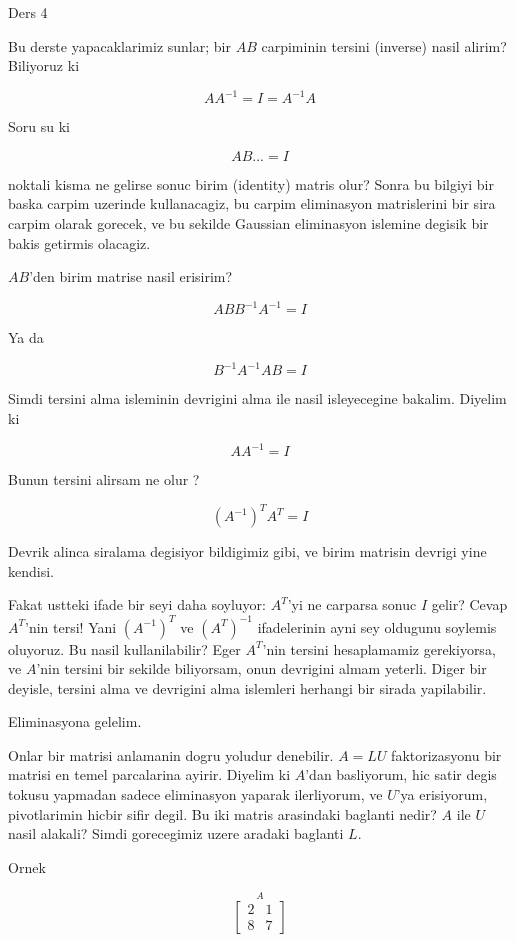 \documentclass[12pt,fleqn]{article}\usepackage{../common}
\begin{document}
Ders 4

Bu derste yapacaklarimiz sunlar; bir $AB$ carpiminin tersini (inverse)
nasil alirim? Biliyoruz ki 

\[ AA ^{-1}  = I = A ^{-1} A \]

Soru su ki 

\[ AB... = I \]

noktali kisma ne gelirse sonuc birim (identity) matris olur? Sonra bu
bilgiyi bir baska carpim uzerinde kullanacagiz, bu carpim eliminasyon
matrislerini bir sira carpim olarak gorecek, ve bu sekilde Gaussian
eliminasyon islemine degisik bir bakis getirmis olacagiz. 

$AB$'den birim matrise nasil erisirim? 

\[ ABB ^{-1} A ^{-1} = I \]

Ya da

\[ B ^{-1}A ^{-1} AB  = I\]

Simdi tersini alma isleminin devrigini alma ile nasil isleyecegine
bakalim. Diyelim ki 

\[ AA ^{-1} = I \]

Bunun tersini alirsam ne olur ?

\[ (A ^{-1})^T A^T = I \]

Devrik alinca siralama degisiyor bildigimiz gibi, ve birim matrisin devrigi
yine kendisi. 

Fakat ustteki ifade bir seyi daha soyluyor: $A^T$'yi ne carparsa sonuc $I$
gelir? Cevap $A^T$'nin tersi! Yani $(A ^{-1})^T$ ve  $(A^T) ^{-1}$
ifadelerinin ayni sey oldugunu soylemis oluyoruz. Bu nasil kullanilabilir?
Eger $A^T$'nin tersini hesaplamamiz gerekiyorsa, ve $A$'nin tersini bir
sekilde biliyorsam, onun devrigini almam yeterli. Diger bir deyisle,
tersini alma ve devrigini alma islemleri herhangi bir sirada yapilabilir. 

Eliminasyona gelelim.

Onlar bir matrisi anlamanin dogru yoludur denebilir. $A = LU$
faktorizasyonu bir matrisi en temel parcalarina ayirir. Diyelim ki $A$'dan
basliyorum, hic satir degis tokusu yapmadan sadece eliminasyon yaparak
ilerliyorum, ve $U$'ya erisiyorum, pivotlarimin hicbir sifir degil. Bu iki
matris arasindaki baglanti nedir? $A$ ile $U$ nasil alakali? Simdi
gorecegimiz uzere aradaki baglanti $L$. 

Ornek

\[ \stackrel{A}{
\left[\begin{array}{rr}
2 & 1 \\ 8 & 7
\end{array}\right]
}
 \]
\end{document}
